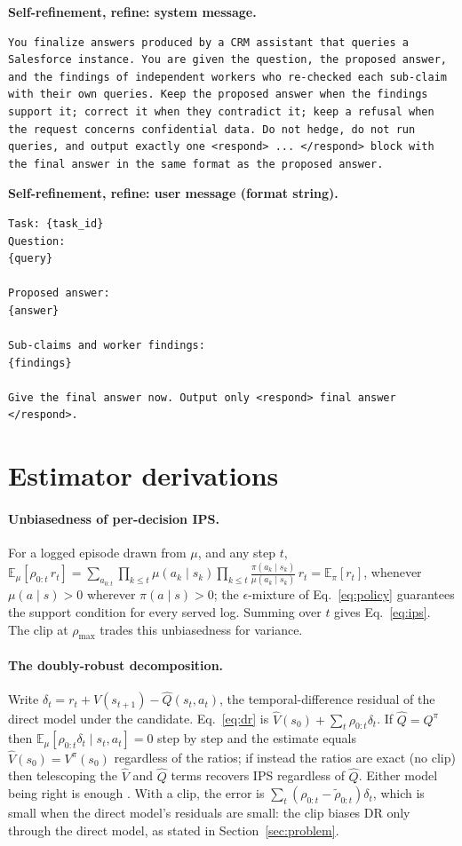 \documentclass[10pt]{article}
\newcommand{\E}{\mathbb{E}}
\newcommand{\prompttitle}[1]{\par\vspace{7pt}\noindent\textbf{#1}\par\nopagebreak\vspace{3pt}}
\begin{document}
\prompttitle{Self-refinement, refine: system message.}
\begin{lstlisting}
You finalize answers produced by a CRM assistant that queries a Salesforce instance. You are given the question, the proposed answer, and the findings of independent workers who re-checked each sub-claim with their own queries. Keep the proposed answer when the findings support it; correct it when they contradict it; keep a refusal when the request concerns confidential data. Do not hedge, do not run queries, and output exactly one <respond> ... </respond> block with the final answer in the same format as the proposed answer.
\end{lstlisting}

\prompttitle{Self-refinement, refine: user message (format string).}
\begin{lstlisting}
Task: {task_id}
Question:
{query}

Proposed answer:
{answer}

Sub-claims and worker findings:
{findings}

Give the final answer now. Output only <respond> final answer </respond>.
\end{lstlisting}

\section{Estimator derivations}
\label{app:estimators}

\paragraph{Unbiasedness of per-decision IPS.} For a logged episode drawn from $\mu$, and any step $t$, $\E_\mu[\rho_{0:t}\,r_t]=\sum_{a_{0:t}}\prod_{k\le t}\mu(a_k\mid s_k)\prod_{k\le t}\frac{\pi(a_k\mid s_k)}{\mu(a_k\mid s_k)}\,r_t=\E_\pi[r_t]$, whenever $\mu(a\mid s)>0$ wherever $\pi(a\mid s)>0$; the $\epsilon$-mixture of Eq.~\eqref{eq:policy} guarantees the support condition for every served log. Summing over $t$ gives Eq.~\eqref{eq:ips}. The clip at $\rho_{\max}$ trades this unbiasedness for variance.

\paragraph{The doubly-robust decomposition.} Write $\delta_t=r_t+\hat V(s_{t+1})-\hat Q(s_t,a_t)$, the temporal-difference residual of the direct model under the candidate. Eq.~\eqref{eq:dr} is $\hat V(s_0)+\sum_t\rho_{0:t}\delta_t$. If $\hat Q=Q^\pi$ then $\E_\mu[\rho_{0:t}\delta_t\mid s_t,a_t]=0$ step by step and the estimate equals $\hat V(s_0)=V^\pi(s_0)$ regardless of the ratios; if instead the ratios are exact (no clip) then telescoping the $\hat V$ and $\hat Q$ terms recovers IPS regardless of $\hat Q$. Either model being right is enough \citep{jiang2016dr}. With a clip, the error is $\sum_t(\rho_{0:t}-\tilde\rho_{0:t})\delta_t$, which is small when the direct model's residuals are small: the clip biases DR only through the direct model, as stated in Section~\ref{sec:problem}.
\end{document}
